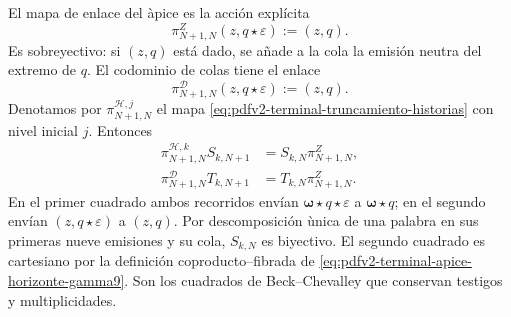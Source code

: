 El mapa de enlace del \`apice es la acci\'on expl\'icita
\begin{equation}
\label{eq:pdfv2-terminal-gamma9-enlace-apice}
 \pi^Z_{N+1,N}(z,q\star\varepsilon):=(z,q).
\end{equation}
Es sobreyectivo: si \((z,q)\) est\'a dado, se a\~nade a la cola la emisi\'on
neutra del extremo de \(q\). El codominio de colas tiene el enlace
\begin{equation}
\label{eq:pdfv2-terminal-gamma9-enlace-codominio}
 \pi^{\mathscr D}_{N+1,N}(z,q\star\varepsilon):=(z,q).
\end{equation}
Denotamos por
\(\pi^{\mathscr H,j}_{N+1,N}\) el mapa
\eqref{eq:pdfv2-terminal-truncamiento-historias} con nivel inicial \(j\).
Entonces
\begin{align}
 \pi^{\mathscr H,k}_{N+1,N}S_{k,N+1}
 &=S_{k,N}\pi^Z_{N+1,N},
 \label{eq:pdfv2-terminal-gamma9-cuadrado-fuente}\\
 \pi^{\mathscr D}_{N+1,N}T_{k,N+1}
 &=T_{k,N}\pi^Z_{N+1,N}.
 \label{eq:pdfv2-terminal-gamma9-cuadrado-destino}
\end{align}
En el primer cuadrado ambos recorridos env\'ian
\(\boldsymbol\omega\star q\star\varepsilon\) a
\(\boldsymbol\omega\star q\); en el segundo env\'ian
\((z,q\star\varepsilon)\) a \((z,q)\). Por descomposici\'on \`unica de una palabra
en sus primeras nueve emisiones y su cola, \(S_{k,N}\) es biyectivo. El
segundo cuadrado es cartesiano por la definici\'on coproducto--fibrada de
\eqref{eq:pdfv2-terminal-apice-horizonte-gamma9}. Son los cuadrados de
Beck--Chevalley que conservan testigos y multiplicidades.

